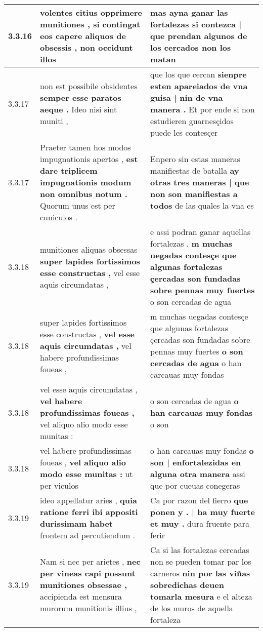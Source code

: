\begin{tabular}{|p{1cm}|p{6.5cm}|p{6.5cm}|}
3.3.16 & volentes citius opprimere munitiones , \textbf{ si contingat eos capere aliquos de obsessis , } non occidunt illos & mas ayna ganar las fortalezas \textbf{ si contezca | que prendan algunos de los cercados } non los matan \\\hline
3.3.17 & non est possibile obsidentes \textbf{ semper esse paratos aeque . } Ideo nisi sint muniti , & que los que cercan \textbf{ sienpre esten apareiados de vna guisa | nin de vna manera . } Et por ende si non estudieren guarnesçidos puede les contesçer \\\hline
3.3.17 & Praeter tamen hos modos impugnationis apertos , \textbf{ est dare triplicem impugnationis modum non omnibus notum . } Quorum unus est per cuniculos . & Enpero sin estas maneras manifiestas de batalla \textbf{ ay otras tres maneras | que non son manifiestas a todos } de las quales la vna es \\\hline
3.3.18 & munitiones aliquas obsessas \textbf{ super lapides fortissimos esse constructas , } vel esse aquis circumdatas , & e assi podran ganar aquellas fortalezas . \textbf{ m muchas uegadas contesçe que algunas fortalezas çercadas son fundadas sobre pennas muy fuertes } o son cercadas de agua \\\hline
3.3.18 & super lapides fortissimos esse constructas , \textbf{ vel esse aquis circumdatas , } vel habere profundissimas foueas , & m muchas uegadas contesçe que algunas fortalezas çercadas son fundadas sobre pennas muy fuertes \textbf{ o son cercadas de agua } o han carcauas muy fondas \\\hline
3.3.18 & vel esse aquis circumdatas , \textbf{ vel habere profundissimas foueas , } vel aliquo alio modo esse munitas : & o son cercadas de agua \textbf{ o han carcauas muy fondas } o son \\\hline
3.3.18 & vel habere profundissimas foueas , \textbf{ vel aliquo alio modo esse munitas : } ut per viculos & o han carcauas muy fondas \textbf{ o son | enfortalezidas en alguna otra manera } assi que por cueuas conegeras \\\hline
3.3.19 & ideo appellatur aries , \textbf{ quia ratione ferri ibi appositi durissimam habet } frontem ad percutiendum . & Ca por razon del fierro \textbf{ que ponen y . | ha muy fuerte et muy . } dura fruente para ferir \\\hline
3.3.19 & Nam si nec per arietes , \textbf{ nec per vineas capi possunt munitiones obsessae , } accipienda est mensura murorum munitionis illius , & Ca si las fortalezas cercadas non se pueden tomar par los carneros \textbf{ nin por las viñas sobredichas deuen tomarla mesura } e el alteza de los muros de aquella fortaleza \\\hline

\end{tabular}
